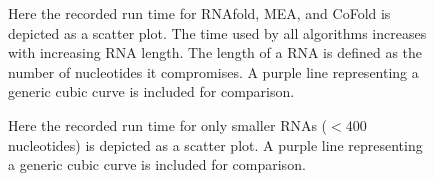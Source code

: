 \documentclass[12pt, a4paper]{article}
\begin{document}
\begin{figure}
\begin{center}
\end{center}
\caption{Here the recorded run time for RNAfold, MEA, and CoFold is depicted as a scatter plot. The time used by all algorithms increases with increasing RNA length. The length of a RNA is defined as the number of nucleotides it compromises. A purple line representing a generic cubic curve is included for comparison.}
\label{fig:timegraph}
\end{figure}


\begin{figure}
\begin{center}
\end{center}
\caption{Here the recorded run time for only smaller RNAs ($< 400$ nucleotides) is depicted as a scatter plot. A purple line representing a generic cubic curve is included for comparison.}
\label{fig:timegraphsmall}
\end{figure}
\end{document}
